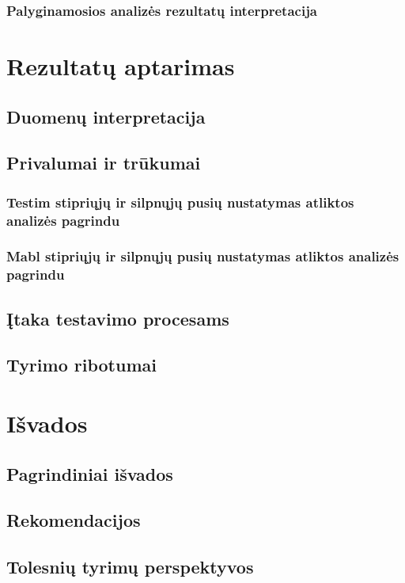 \documentclass[
]{VUMIFPSkursinis}
\begin{document}
\subsubsection{Palyginamosios analizės rezultatų interpretacija}

\section{Rezultatų aptarimas}

\subsection{Duomenų interpretacija}
\subsection{Privalumai ir trūkumai}
\subsubsection{Testim stipriųjų ir silpnųjų pusių nustatymas atliktos analizės pagrindu}
\subsubsection{Mabl stipriųjų ir silpnųjų pusių nustatymas atliktos analizės pagrindu}
\subsection{Įtaka testavimo procesams}
\subsection{Tyrimo ribotumai}

\section{Išvados}

\subsection{Pagrindiniai išvados}
\subsection{Rekomendacijos}
\subsection{Tolesnių tyrimų perspektyvos}
\end{document}
